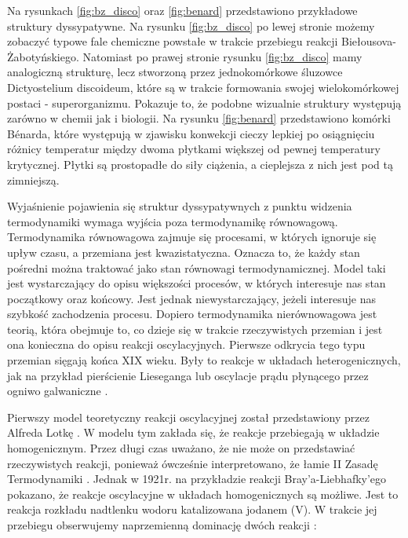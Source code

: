 \documentclass[10pt, a4paper, twoside, onecolumn]{article}
\numberwithin{equation}{section}
\begin{document}
	Na rysunkach \ref{fig:bz_disco} oraz \ref{fig:benard} przedstawiono przykładowe struktury dyssypatywne. Na rysunku \ref{fig:bz_disco} po lewej stronie możemy zobaczyć typowe fale chemiczne powstałe w trakcie przebiegu reakcji Biełousova-Żabotyńskiego. Natomiast po prawej stronie rysunku \ref{fig:bz_disco} mamy analogiczną strukturę, lecz stworzoną przez jednokomórkowe śluzowce Dictyostelium discoideum, które są w trakcie formowania swojej wielokomórkowej postaci - superorganizmu. Pokazuje to, że podobne wizualnie struktury występują zarówno w chemii jak i biologii. Na rysunku \ref{fig:benard} przedstawiono komórki B\'{e}narda, które występują w zjawisku konwekcji cieczy lepkiej po osiągnięciu różnicy temperatur między dwoma płytkami większej od pewnej temperatury krytycznej. Płytki są prostopadłe do siły ciążenia, a cieplejsza z nich jest pod tą zimniejszą. \par
	Wyjaśnienie pojawienia się struktur dyssypatywnych z punktu widzenia termodynamiki wymaga wyjścia poza termodynamikę równowagową. Termodynamika równowagowa zajmuje się procesami, w których ignoruje się upływ czasu, a przemiana jest kwazistatyczna. Oznacza to, że każdy stan pośredni można traktować jako stan równowagi termodynamicznej. Model taki jest wystarczający do opisu większości procesów, %
	w których interesuje nas stan początkowy oraz końcowy. Jest jednak niewystarczający, jeżeli interesuje nas szybkość zachodzenia procesu. Dopiero termodynamika nierównowagowa jest teorią, która obejmuje to, co dzieje się w trakcie rzeczywistych przemian i jest ona konieczna do opisu reakcji oscylacyjnych. Pierwsze odkrycia tego typu przemian sięgają końca XIX wieku. Były to reakcje w układach heterogenicznych, jak na przykład pierścienie Lieseganga lub oscylacje prądu płynącego przez ogniwo galwaniczne \cite{orlik}. \par
	Pierwszy model teoretyczny reakcji oscylacyjnej został przedstawiony przez Alfreda Lotkę \cite{lotka}. W modelu tym zakłada się, że reakcje przebiegają w układzie homogenicznym. Przez długi czas uważano, że nie może on przedstawiać rzeczywistych reakcji, ponieważ ówcześnie interpretowano, że łamie II Zasadę Termodynamiki \cite{orlik_sily_w_przyrodzie}. Jednak w 1921r. na przykładzie reakcji Bray'a-Liebhafky'ego pokazano, że reakcje oscylacyjne w układach homogenicznych są możliwe. Jest to reakcja rozkładu nadtlenku wodoru katalizowana jodanem (V). W trakcie jej przebiegu obserwujemy naprzemienną dominację dwóch reakcji \cite{orlik}:
\end{document}
